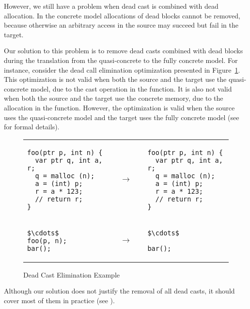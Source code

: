 However, we still have a problem when dead cast is combined with dead
allocation. In the concrete model allocations of dead blocks cannot be
removed, because otherwise an arbitrary access in the source may
succeed but fail in the target. 

Our solution to this problem is to remove dead casts combined with dead blocks during
the translation from the quasi-concrete to the fully concrete model.
For instance, consider the dead call elimination optimization presented in Figure~\ref{code:deadcast}. This optimization is not valid when both the source and
the target use the quasi-concrete model, due to the cast operation in the
function. It is also not valid when both the source and the target use
the concrete memory, due to the allocation in the function. However, the optimization is valid when the source uses the
quasi-concrete model and the target uses the fully concrete model (see  for formal details).

\begin{figure}[t]
\center
\begin{tabular}{@{}l@{}l@{~~}l}
\begin{lstlisting}
foo(ptr p, int n) {
  var ptr q, int a, r;
  q = malloc (n);
  a = (int) p;
  r = a * 123;
  // return r;
}
\end{lstlisting}
&
$\quad\rightarrow\quad$
&
\begin{lstlisting}
foo(ptr p, int n) {
  var ptr q, int a, r;
  q = malloc (n);
  a = (int) p;
  r = a * 123;
  // return r;
}
\end{lstlisting}
\\
\begin{lstlisting}
$\cdots$
foo(p, n);
bar();
\end{lstlisting}
&
$\quad\rightarrow\quad$
&
\begin{lstlisting}
$\cdots$

bar();
\end{lstlisting}
\end{tabular}
\caption{Dead Cast Elimination Example}
\label{code:deadcast}
\end{figure}

Although our solution does not justify the removal of all dead casts,
it should cover most of them in practice (see ).



